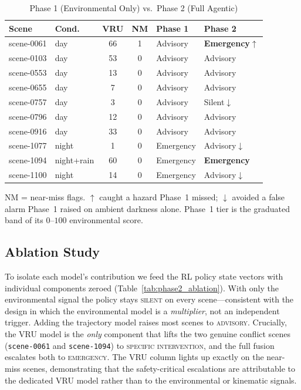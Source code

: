 \begin{table}[htbp]
\caption{Phase 1 (Environmental Only) vs.\ Phase 2 (Full Agentic)}
\label{tab:phase2_coverage}
\centering
\begin{tabular}{llccll}
\toprule
\textbf{Scene} & \textbf{Cond.} & \textbf{VRU} & \textbf{NM} & \textbf{Phase 1} & \textbf{Phase 2} \\
\midrule
scene-0061 & day        & 66 & 1 & Advisory  & \textbf{Emergency}$\uparrow$ \\
scene-0103 & day        & 53 & 0 & Advisory  & Advisory \\
scene-0553 & day        & 13 & 0 & Advisory  & Advisory \\
scene-0655 & day        &  7 & 0 & Advisory  & Advisory \\
scene-0757 & day        &  3 & 0 & Advisory  & Silent$\downarrow$ \\
scene-0796 & day        & 12 & 0 & Advisory  & Advisory \\
scene-0916 & day        & 33 & 0 & Advisory  & Advisory \\
scene-1077 & night      &  1 & 0 & Emergency & Advisory$\downarrow$ \\
scene-1094 & night+rain & 60 & 0 & Emergency & \textbf{Emergency} \\
scene-1100 & night      & 14 & 0 & Emergency & Advisory$\downarrow$ \\
\bottomrule
\end{tabular}
\vspace{2pt}
\footnotesize{NM = near-miss flags. $\uparrow$ caught a hazard Phase~1 missed;
$\downarrow$ avoided a false alarm Phase~1 raised on ambient darkness alone.
Phase~1 tier is the graduated band of its $0$--$100$ environmental score.}
\end{table}

\subsection{Ablation Study}
To isolate each model's contribution we feed the RL policy state vectors with
individual components zeroed (Table~\ref{tab:phase2_ablation}). With only the
environmental signal the policy stays \textsc{silent} on every scene---consistent
with the design in which the environmental model is a \emph{multiplier}, not an
independent trigger. Adding the trajectory model raises most scenes to
\textsc{advisory}. Crucially, the VRU model is the \emph{only} component that
lifts the two genuine conflict scenes (\texttt{scene-0061} and \texttt{scene-1094})
to \textsc{specific intervention}, and the full fusion escalates both to
\textsc{emergency}. The VRU column lights up exactly on the near-miss scenes,
demonstrating that the safety-critical escalations are attributable to the
dedicated VRU model rather than to the environmental or kinematic signals.

